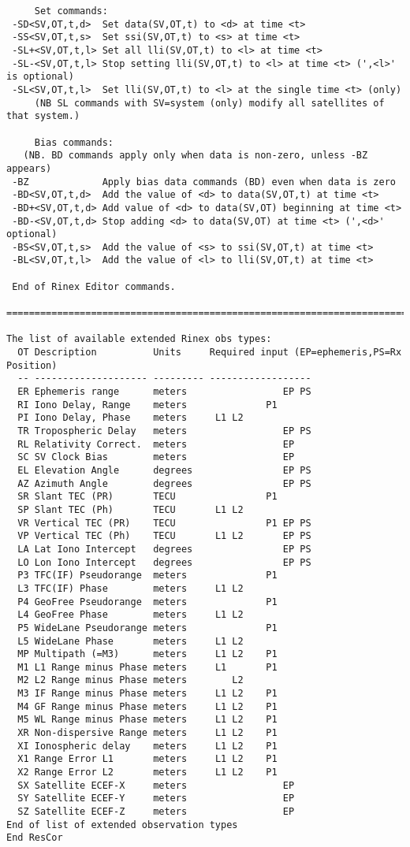 \begin{\outputsize}
\begin{verbatim}
     Set commands:
 -SD<SV,OT,t,d>  Set data(SV,OT,t) to <d> at time <t>
 -SS<SV,OT,t,s>  Set ssi(SV,OT,t) to <s> at time <t>
 -SL+<SV,OT,t,l> Set all lli(SV,OT,t) to <l> at time <t>
 -SL-<SV,OT,t,l> Stop setting lli(SV,OT,t) to <l> at time <t> (',<l>' is optional)
 -SL<SV,OT,t,l>  Set lli(SV,OT,t) to <l> at the single time <t> (only)
     (NB SL commands with SV=system (only) modify all satellites of that system.)

     Bias commands:
   (NB. BD commands apply only when data is non-zero, unless -BZ appears)
 -BZ             Apply bias data commands (BD) even when data is zero
 -BD<SV,OT,t,d>  Add the value of <d> to data(SV,OT,t) at time <t>
 -BD+<SV,OT,t,d> Add value of <d> to data(SV,OT) beginning at time <t>
 -BD-<SV,OT,t,d> Stop adding <d> to data(SV,OT) at time <t> (',<d>' optional)
 -BS<SV,OT,t,s>  Add the value of <s> to ssi(SV,OT,t) at time <t>
 -BL<SV,OT,t,l>  Add the value of <l> to lli(SV,OT,t) at time <t>

 End of Rinex Editor commands.
 ==============================================================================

The list of available extended Rinex obs types:
  OT Description          Units     Required input (EP=ephemeris,PS=Rx Position)
  -- -------------------- --------- ------------------
  ER Ephemeris range      meters                 EP PS
  RI Iono Delay, Range    meters              P1
  PI Iono Delay, Phase    meters     L1 L2
  TR Tropospheric Delay   meters                 EP PS
  RL Relativity Correct.  meters                 EP
  SC SV Clock Bias        meters                 EP
  EL Elevation Angle      degrees                EP PS
  AZ Azimuth Angle        degrees                EP PS
  SR Slant TEC (PR)       TECU                P1
  SP Slant TEC (Ph)       TECU       L1 L2
  VR Vertical TEC (PR)    TECU                P1 EP PS
  VP Vertical TEC (Ph)    TECU       L1 L2       EP PS
  LA Lat Iono Intercept   degrees                EP PS
  LO Lon Iono Intercept   degrees                EP PS
  P3 TFC(IF) Pseudorange  meters              P1
  L3 TFC(IF) Phase        meters     L1 L2
  P4 GeoFree Pseudorange  meters              P1
  L4 GeoFree Phase        meters     L1 L2
  P5 WideLane Pseudorange meters              P1
  L5 WideLane Phase       meters     L1 L2
  MP Multipath (=M3)      meters     L1 L2    P1
  M1 L1 Range minus Phase meters     L1       P1
  M2 L2 Range minus Phase meters        L2
  M3 IF Range minus Phase meters     L1 L2    P1
  M4 GF Range minus Phase meters     L1 L2    P1
  M5 WL Range minus Phase meters     L1 L2    P1
  XR Non-dispersive Range meters     L1 L2    P1
  XI Ionospheric delay    meters     L1 L2    P1
  X1 Range Error L1       meters     L1 L2    P1
  X2 Range Error L2       meters     L1 L2    P1
  SX Satellite ECEF-X     meters                 EP
  SY Satellite ECEF-Y     meters                 EP
  SZ Satellite ECEF-Z     meters                 EP
End of list of extended observation types
End ResCor

\end{verbatim}
\end{\outputsize}

